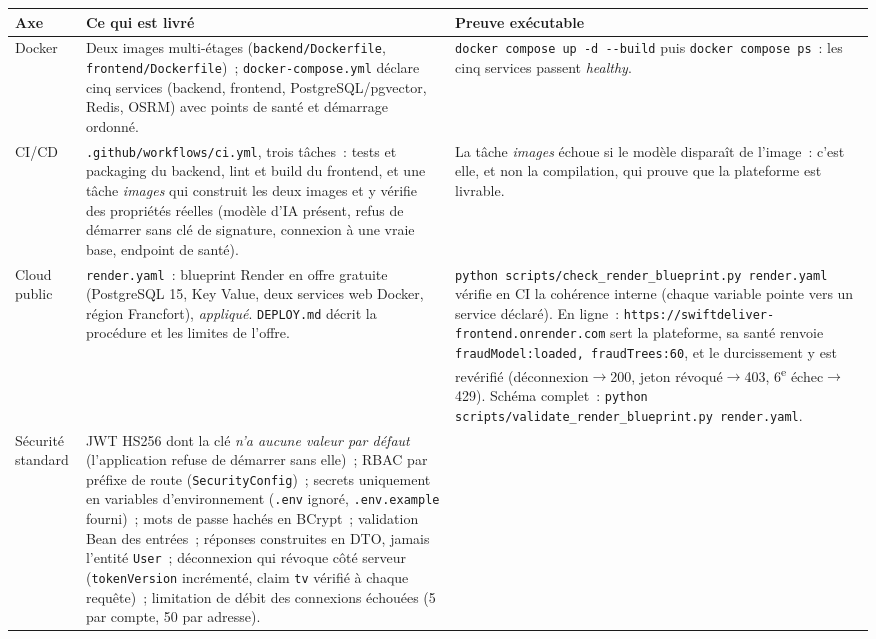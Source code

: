\documentclass[11pt,a4paper]{article}
\begin{document}
\begin{tabular}{|p{2.7cm}|p{7.2cm}|p{4.8cm}|}
\hline
\textbf{Axe} & \textbf{Ce qui est livr\'e} & \textbf{Preuve ex\'ecutable} \\
\hline
Docker &
Deux images multi-\'etages (\texttt{backend/Dockerfile}, \texttt{frontend/Dockerfile})~; \texttt{docker-compose.yml} d\'eclare cinq services (backend, frontend, PostgreSQL/pgvector, Redis, OSRM) avec points de sant\'e et d\'emarrage ordonn\'e. &
\texttt{docker compose up -d -{}-build} puis \texttt{docker compose ps}~: les cinq services passent \emph{healthy}. \\
\hline
CI/CD &
\texttt{.github/workflows/ci.yml}, trois t\^aches~: tests et packaging du backend, lint et build du frontend, et une t\^ache \emph{images} qui construit les deux images et y v\'erifie des propri\'et\'es r\'eelles (mod\`ele d'IA pr\'esent, refus de d\'emarrer sans cl\'e de signature, connexion \`a une vraie base, endpoint de sant\'e). &
La t\^ache \emph{images} \'echoue si le mod\`ele dispara\^it de l'image~: c'est elle, et non la compilation, qui prouve que la plateforme est livrable. \\
\hline
Cloud public &
\texttt{render.yaml}~: blueprint Render en offre gratuite (PostgreSQL 15, Key Value, deux services web Docker, r\'egion Francfort), \emph{appliqu\'e}. \texttt{DEPLOY.md} d\'ecrit la proc\'edure et les limites de l'offre. &
\texttt{python scripts/check\_render\_blueprint.py render.yaml} v\'erifie en CI la coh\'erence interne (chaque variable pointe vers un service d\'eclar\'e). En ligne~: \texttt{https://swiftdeliver-frontend.onrender.com} sert la plateforme, sa sant\'e renvoie \texttt{fraudModel:loaded, fraudTrees:60}, et le durcissement y est rev\'erifi\'e (d\'econnexion$\rightarrow$200, jeton r\'evoqu\'e$\rightarrow$403, 6\textsuperscript{e} \'echec$\rightarrow$429). Sch\'ema complet~: \texttt{python scripts/validate\_render\_blueprint.py render.yaml}. \\
\hline
S\'ecurit\'e standard &
JWT HS256 dont la cl\'e \emph{n'a aucune valeur par d\'efaut} (l'application refuse de d\'emarrer sans elle)~; RBAC par pr\'efixe de route (\texttt{SecurityConfig})~; secrets uniquement en variables d'environnement (\texttt{.env} ignor\'e, \texttt{.env.example} fourni)~; mots de passe hach\'es en BCrypt~; validation Bean des entr\'ees~; r\'eponses construites en DTO, jamais l'entit\'e \texttt{User}~; d\'econnexion qui r\'evoque c\^ot\'e serveur (\texttt{tokenVersion} incr\'ement\'e, claim \texttt{tv} v\'erifi\'e \`a chaque requ\^ete)~; limitation de d\'ebit des connexions \'echou\'ees (5 par compte, 50 par adresse). &

\end{tabular}
\end{document}
